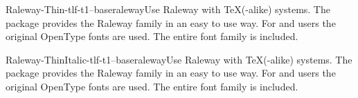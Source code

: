 \documentclass{ddltxtyp}
\begin{document}
\begin{package}{Raleway-Thin-tlf-t1--base}{raleway}{Use Raleway with {\TeX}(-alike) systems.}
The package provides the Raleway family in an easy to use way.
For {\XeLaTeX} and {\LuaLaTeX} users the original OpenType fonts are
used. The entire font family is included.
\end{package}
\begin{package}{Raleway-ThinItalic-tlf-t1--base}{raleway}{Use Raleway with {\TeX}(-alike) systems.}
The package provides the Raleway family in an easy to use way.
For {\XeLaTeX} and {\LuaLaTeX} users the original OpenType fonts are
used. The entire font family is included.
\end{package}



\end{document}
